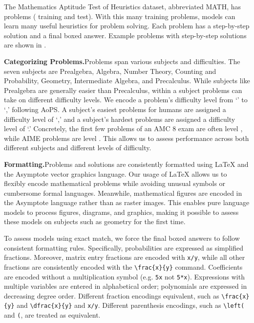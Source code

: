 \documentclass{article}
\begin{document}
The Mathematics Aptitude Test of Heuristics dataset, abbreviated MATH, has  problems ( training and  test). With this many training problems, models can learn many useful heuristics for problem solving. Each problem has a step-by-step solution and a final boxed answer. Example problems with step-by-step solutions are shown in .



\textbf{Categorizing Problems.}\quad Problems span various subjects and difficulties. The seven subjects are 
Prealgebra, Algebra, Number Theory, Counting and Probability, Geometry, Intermediate Algebra, and Precalculus. While subjects like Prealgebra are generally easier than Precalculus, within a subject problems can take on different difficulty levels. We encode a problem's difficulty level from `' to `,' following AoPS. A subject's easiest problems for humans are assigned a difficulty level of `,' and a subject's hardest problems are assigned a difficulty level of `.' Concretely, the first few problems of an AMC 8 exam are often level , while AIME problems are level . 
This allows us to assess performance across both different subjects and different levels of difficulty.




\textbf{Formatting.}\quad Problems and solutions are consistently formatted using \LaTeX{} and the Asymptote vector graphics language. Our usage of \LaTeX{} allows us to flexibly encode mathematical problems while avoiding unusual symbols or cumbersome formal languages. Meanwhile, mathematical figures are encoded in the Asymptote language rather than as raster images. 
This enables pure language models to process figures, diagrams, and graphics, making it possible to assess these models on subjects such as geometry for the first time. 

To assess models using exact match, we force the final boxed answers to follow consistent formatting rules.
Specifically, probabilities are expressed as simplified fractions. Moreover, matrix entry fractions are encoded with \verb|x/y|, while all other fractions are consistently encoded with the \verb|\frac{x}{y}| command. Coefficients are encoded without a multiplication symbol (e.g. \verb|5x| not \verb|5*x|). Expressions with multiple variables are entered in alphabetical order; polynomials are expressed in decreasing degree order. Different fraction encodings equivalent, such as \texttt{\textbackslash frac\{x\}\{y\}} and \texttt{\textbackslash dfrac\{x\}\{y\}} and \texttt{x/y}. Different parenthesis encodings, such as \texttt{\textbackslash left(} and \texttt{(}, are treated as equivalent.
\end{document}
